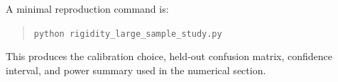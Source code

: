 \documentclass[11pt]{article}
\begin{document}
A minimal reproduction command is:
\begin{quote}
\texttt{python rigidity\_large\_sample\_study.py}
\end{quote}

This produces the calibration choice, held-out confusion matrix, confidence interval, and power summary used in the numerical section.
\end{document}
